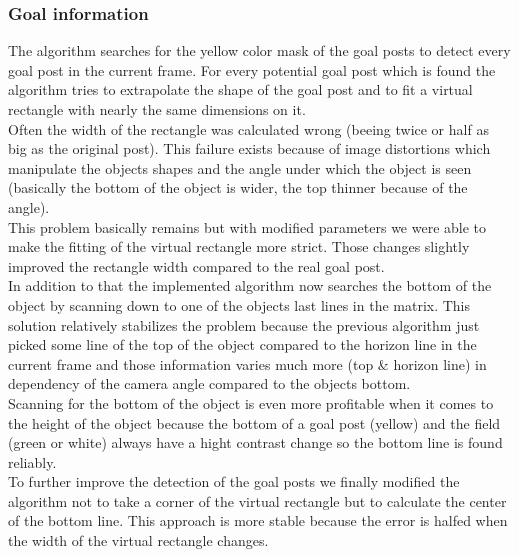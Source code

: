 \documentclass[lnicst,a4paper]{svmultln}
\begin{document}
\subsubsection{Goal information}
The algorithm searches for the yellow color mask of the goal posts to detect every goal post in the current frame. For every potential goal post which is found the algorithm tries to extrapolate the shape of the goal post and to fit a virtual rectangle with nearly the same dimensions on it.
\\
Often the width of the rectangle was calculated wrong (beeing twice or half as big as the original post). This failure exists because of image distortions which manipulate the objects shapes and the angle under which the object is seen (basically the bottom of the object is wider, the top thinner because of the angle).
\\
This problem basically remains but with modified parameters we were able to make the fitting of the virtual rectangle more strict. Those changes slightly improved the rectangle width compared to the real goal post.
\\
In addition to that the implemented algorithm now searches the bottom of the object by scanning down to one of the objects last lines in the matrix. This solution relatively stabilizes the problem because the previous algorithm just picked some line of the top of the object compared to the horizon line in the current frame and those information varies much more (top \& horizon line) in dependency of the camera angle compared to the objects bottom.
\\
Scanning for the bottom of the object is even more profitable when it comes to the height of the object because the bottom of a goal post (yellow) and the field (green or white) always have a hight contrast change so the bottom line is found reliably.
\\
To further improve the detection of the goal posts we finally modified the algorithm not to take a corner of the virtual rectangle but to calculate the center of the bottom line. This approach is more stable because the error is halfed when the width of the virtual rectangle changes.
\end{document}
